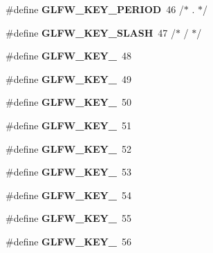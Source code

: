 \begin{DoxyCompactItemize}
\mbox{\label{group__keys_ga37e296b650eab419fc474ff69033d927}} 
\#define {\bfseries G\+L\+F\+W\+\_\+\+K\+E\+Y\+\_\+\+P\+E\+R\+I\+OD}~46  /$\ast$ . $\ast$/
\item 
\mbox{\label{group__keys_gadf3d753b2d479148d711de34b83fd0db}} 
\#define {\bfseries G\+L\+F\+W\+\_\+\+K\+E\+Y\+\_\+\+S\+L\+A\+SH}~47  /$\ast$ / $\ast$/
\item 
\mbox{\label{group__keys_ga50391730e9d7112ad4fd42d0bd1597c1}} 
\#define {\bfseries G\+L\+F\+W\+\_\+\+K\+E\+Y\+\_}~48
\item 
\mbox{\label{group__keys_ga05e4cae9ddb8d40cf6d82c8f11f2502f}} 
\#define {\bfseries G\+L\+F\+W\+\_\+\+K\+E\+Y\+\_}~49
\item 
\mbox{\label{group__keys_gadc8e66b3a4c4b5c39ad1305cf852863c}} 
\#define {\bfseries G\+L\+F\+W\+\_\+\+K\+E\+Y\+\_}~50
\item 
\mbox{\label{group__keys_ga812f0273fe1a981e1fa002ae73e92271}} 
\#define {\bfseries G\+L\+F\+W\+\_\+\+K\+E\+Y\+\_}~51
\item 
\mbox{\label{group__keys_ga9e14b6975a9cc8f66cdd5cb3d3861356}} 
\#define {\bfseries G\+L\+F\+W\+\_\+\+K\+E\+Y\+\_}~52
\item 
\mbox{\label{group__keys_ga4d74ddaa5d4c609993b4d4a15736c924}} 
\#define {\bfseries G\+L\+F\+W\+\_\+\+K\+E\+Y\+\_}~53
\item 
\mbox{\label{group__keys_ga9ea4ab80c313a227b14d0a7c6f810b5d}} 
\#define {\bfseries G\+L\+F\+W\+\_\+\+K\+E\+Y\+\_}~54
\item 
\mbox{\label{group__keys_gab79b1cfae7bd630cfc4604c1f263c666}} 
\#define {\bfseries G\+L\+F\+W\+\_\+\+K\+E\+Y\+\_}~55
\item 
\mbox{\label{group__keys_gadeaa109a0f9f5afc94fe4a108e686f6f}} 
\#define {\bfseries G\+L\+F\+W\+\_\+\+K\+E\+Y\+\_}~56
\item 
\mbox{\label{group__keys_ga2924cb5349ebbf97c8987f3521c44f39}} 

\end{DoxyCompactItemize}
